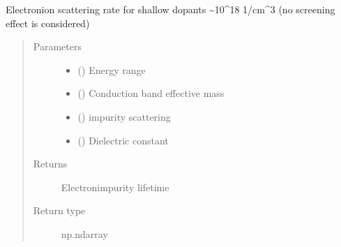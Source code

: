 \documentclass[letterpaper,10pt,english]{sphinxmanual}
\begin{document}
\begin{fulllineitems}
\label{\detokenize{autosummary/ThermoElectric.tau_unscreened_coulomb:ThermoElectric.tau_unscreened_coulomb}}
\sphinxAtStartPar
Electron\sphinxhyphen{}ion scattering rate for shallow dopants \textasciitilde{}10\textasciicircum{}18 1/cm\textasciicircum{}3
(no screening effect is considered)
\begin{quote}\begin{description}
\item[{Parameters}] \leavevmode\begin{itemize}
\item {} 
\sphinxAtStartPar
{} () \textendash{} Energy range

\item {} 
\sphinxAtStartPar
{} () \textendash{} Conduction band effective mass

\item {} 
\sphinxAtStartPar
{} () \textendash{} impurity scattering

\item {} 
\sphinxAtStartPar
{} () \textendash{} Dielectric constant

\end{itemize}

\item[{Returns}] \leavevmode
\sphinxAtStartPar
{} \textendash{} Electron\sphinxhyphen{}impurity lifetime

\item[{Return type}] \leavevmode
\sphinxAtStartPar
np.ndarray

\end{description}\end{quote}

\end{fulllineitems}
\end{document}
